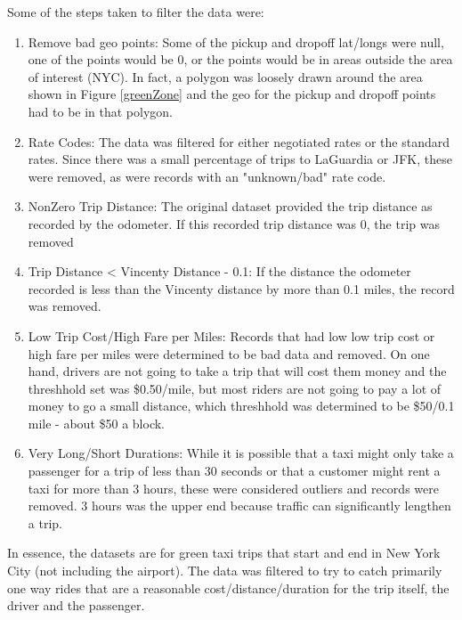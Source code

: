 \documentclass[conference]{IEEEtran}
\begin{document}
Some of the steps taken to filter the data were:
\begin{enumerate}
\item{Remove bad geo points: Some of the pickup and dropoff lat/longs were null, one of the points would be 0, or the points would be in areas outside the area of interest (NYC).  In fact, a polygon was loosely drawn around the area shown in Figure \ref{greenZone} and the geo for the pickup and dropoff points had to be in that polygon. }
\item{Rate Codes: The data was filtered for either negotiated rates or the standard rates.  Since there was a small percentage of trips to LaGuardia or JFK, these were removed, as were records with an "unknown/bad" rate code.}
\item{NonZero Trip Distance: The original dataset provided the trip distance as recorded by the odometer.  If this recorded trip distance was 0, the trip was removed }
\item{Trip Distance < Vincenty Distance - 0.1: If the distance the odometer recorded is less than the Vincenty distance by more than 0.1 miles, the record was removed.}
\item{Low Trip Cost/High Fare per Miles: Records that had low low trip cost or high fare per miles were determined to be bad data and removed.  On one hand, drivers are not going to take a trip that will cost them money and the threshhold set was \$0.50/mile, but most riders are not going to pay a lot of money to go a small distance, which threshhold was determined to be \$50/0.1 mile - about \$50 a block.}
\item{Very Long/Short Durations: While it is possible that a taxi might only take a passenger for a trip of less than 30 seconds or that a customer might rent a taxi for more than 3 hours, these were considered outliers and records were removed.  3 hours was the upper end because traffic can significantly lengthen a trip.}

\end{enumerate}

In essence, the datasets are for green taxi trips that start and end in New York City (not including the airport).  The data was filtered to try to catch primarily one way rides that are a reasonable cost/distance/duration for the trip itself, the driver and the passenger.
\end{document}
